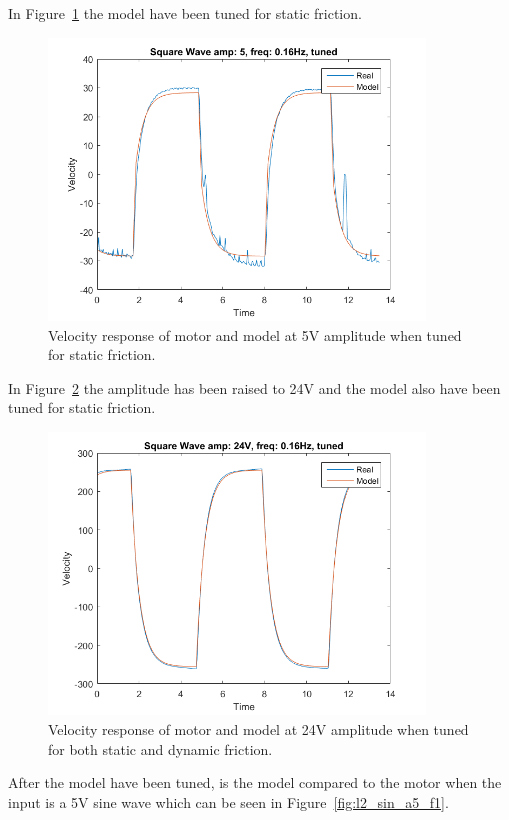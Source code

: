 \documentclass[12pt,a4paper]{article}
\begin{document}
In Figure~\ref{fig:l2_sq_a5_f016_fcTuned} the model
have been tuned for static friction. 
\begin{figure}[H]
    \centering
    \includegraphics[width=100mm]{l2_sq_a5_f016_fcTuned.png}
    \caption{Velocity response of motor and model at 5V amplitude when
    tuned for static friction.}
    \label{fig:l2_sq_a5_f016_fcTuned}
\end{figure}
In Figure~\ref{fig:l2_sq_a24_f016_fcTuned} the amplitude has been
raised to 24V and the model also have been tuned for static friction.
\begin{figure}[H]
    \centering
    \includegraphics[width=100mm]{l2_sq_a24_f016_fcTuned.png}
    \caption{Velocity response of motor and model at 24V amplitude when
    tuned for both static and dynamic friction.}
    \label{fig:l2_sq_a24_f016_fcTuned}
\end{figure}
After the model have been tuned, is the model compared to the motor when
the input is a 5V sine wave which can be seen in
Figure~\ref{fig:l2_sin_a5_f1}.
\end{document}
